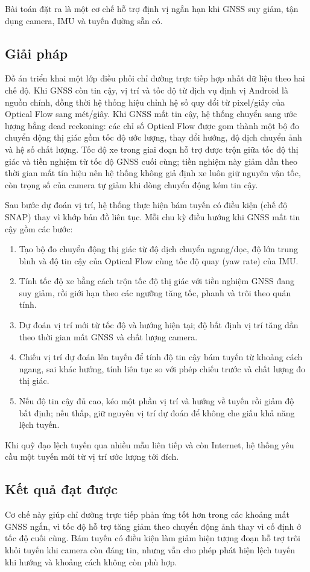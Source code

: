 \documentclass[../DoAn.tex]{subfiles}
\begin{document}
Bài toán đặt ra là một cơ chế hỗ trợ định vị ngắn hạn khi GNSS suy giảm, tận dụng camera, IMU và tuyến đường sẵn có.

\subsection{Giải pháp}
Đồ án triển khai một lớp điều phối chỉ đường trực tiếp hợp nhất dữ liệu theo hai chế độ. Khi GNSS còn tin cậy, vị trí và tốc độ từ dịch vụ định vị Android là nguồn chính, đồng thời hệ thống hiệu chỉnh hệ số quy đổi từ pixel/giây của Optical Flow sang mét/giây. Khi GNSS mất tin cậy, hệ thống chuyển sang ước lượng bằng dead reckoning: các chỉ số Optical Flow được gom thành một bộ đo chuyển động thị giác gồm tốc độ ước lượng, thay đổi hướng, độ dịch chuyển ảnh và hệ số chất lượng. Tốc độ xe trong giai đoạn hỗ trợ được trộn giữa tốc độ thị giác và tiền nghiệm từ tốc độ GNSS cuối cùng; tiền nghiệm này giảm dần theo thời gian mất tín hiệu nên hệ thống không giả định xe luôn giữ nguyên vận tốc, còn trọng số của camera tự giảm khi dòng chuyển động kém tin cậy.

Sau bước dự đoán vị trí, hệ thống thực hiện bám tuyến có điều kiện (chế độ SNAP) thay vì khớp bản đồ liên tục. Mỗi chu kỳ điều hướng khi GNSS mất tin cậy gồm các bước:
\begin{enumerate}
    \item Tạo bộ đo chuyển động thị giác từ độ dịch chuyển ngang/dọc, độ lớn trung bình và độ tin cậy của Optical Flow cùng tốc độ quay (yaw rate) của IMU.
    \item Tính tốc độ xe bằng cách trộn tốc độ thị giác với tiền nghiệm GNSS đang suy giảm, rồi giới hạn theo các ngưỡng tăng tốc, phanh và trôi theo quán tính.
    \item Dự đoán vị trí mới từ tốc độ và hướng hiện tại; độ bất định vị trí tăng dần theo thời gian mất GNSS và chất lượng camera.
    \item Chiếu vị trí dự đoán lên tuyến để tính độ tin cậy bám tuyến từ khoảng cách ngang, sai khác hướng, tính liên tục so với phép chiếu trước và chất lượng đo thị giác.
    \item Nếu độ tin cậy đủ cao, kéo một phần vị trí và hướng về tuyến rồi giảm độ bất định; nếu thấp, giữ nguyên vị trí dự đoán để không che giấu khả năng lệch tuyến.
\end{enumerate}
Khi quỹ đạo lệch tuyến qua nhiều mẫu liên tiếp và còn Internet, hệ thống yêu cầu một tuyến mới từ vị trí ước lượng tới đích.

\subsection{Kết quả đạt được}
Cơ chế này giúp chỉ đường trực tiếp phản ứng tốt hơn trong các khoảng mất GNSS ngắn, vì tốc độ hỗ trợ tăng giảm theo chuyển động ảnh thay vì cố định ở tốc độ cuối cùng. Bám tuyến có điều kiện làm giảm hiện tượng đoạn hỗ trợ trôi khỏi tuyến khi camera còn đáng tin, nhưng vẫn cho phép phát hiện lệch tuyến khi hướng và khoảng cách không còn phù hợp.
\end{document}
